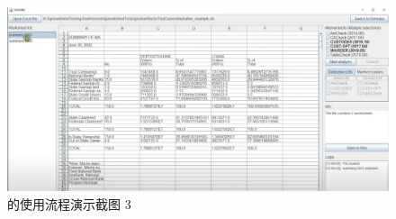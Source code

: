 \begin{figure}[tbp]    
    \centering
    \includegraphics[width=\textwidth]{figure/sg/sguard-3.png}
    \caption{\sg 的使用流程演示截图 3}
    \label{figure-sg3}
\end{figure}